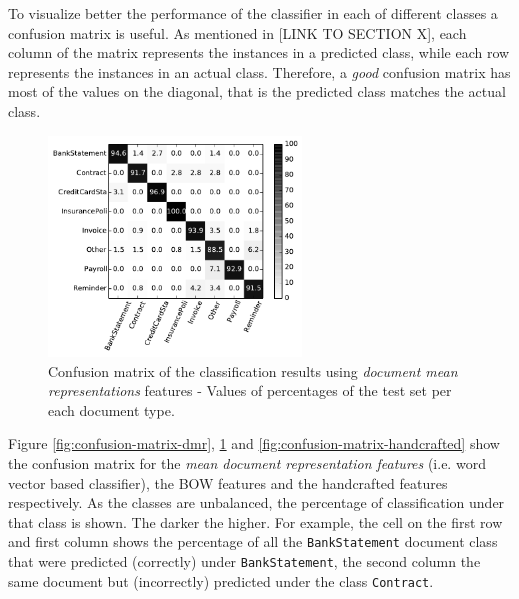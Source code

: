 To visualize better the performance of the classifier in each of different
classes a confusion matrix is useful. As mentioned in [LINK TO SECTION X],
each column of the matrix represents the instances in a predicted class,
while each row represents the instances in an actual class. Therefore, a
\textit{good} confusion matrix has most of the values on the diagonal, that
is the predicted class matches the actual class. 

\begin{figure}[!htbp]
    \centering
    \includegraphics[width=0.6\textwidth]{images/003-xvalidaton-bow.pdf}
    \caption{Confusion matrix of the classification results  using \textit{document mean
      representations} features - Values of percentages of the test set per
    each document type.}
    \label{fig:confusion-matrix-bow}
\end{figure}


Figure \ref{fig:confusion-matrix-dmr},  \ref{fig:confusion-matrix-bow} and 
\ref{fig:confusion-matrix-handcrafted} show the confusion matrix for the
\textit{mean document representation features} (i.e. word vector based
classifier),  the \ac{BOW} features  and the handcrafted features
respectively. As the classes are unbalanced, the percentage of classification
under that class is  shown. The darker the higher.  For example, the cell on
the first row and first column shows the percentage of all the
\texttt{BankStatement} document class that were predicted  (correctly) under
\texttt{BankStatement}, the second column the same document but (incorrectly)
 predicted under the class \texttt{Contract}.   


